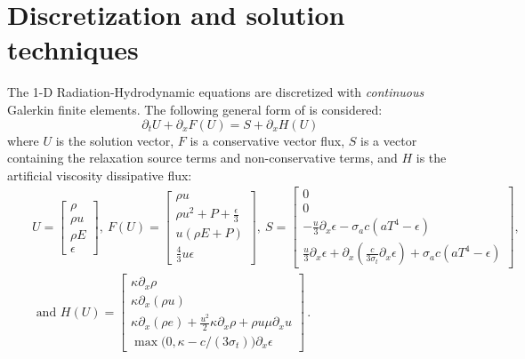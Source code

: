 \documentclass[times,doublespace]{fldauth}%
\begin{document}
\section{Discretization and solution techniques}
\label{sec:discr}
%
The 1-D Radiation-Hydrodynamic equations  are discretized with \emph{continuous} Galerkin finite elements. 
The following general form of  is considered:
\begin{equation}
\label{eq:form}
\partial_t U + \partial_x F \left( U \right) = S + \partial_x H \left(U\right) \,
\end{equation}
where $U$ is the solution vector, $F$ is a conservative vector flux, $S$ is a vector containing the relaxation source terms and non-conservative terms, and $H$ is the artificial viscosity dissipative flux:
\begin{eqnarray*}
&&U = 
\begin{bmatrix}
\rho \\
\rho u \\
\rho E \\
\epsilon
\end{bmatrix}
,\
F(U) = 
\begin{bmatrix}
\rho u \\
\rho u^2 + P + \frac{\epsilon}{3} \\
u \left( \rho E + P \right) \\
\frac{4}{3} u \epsilon
\end{bmatrix}
,\ 
S = 
\begin{bmatrix}
0 \\
0 \\
-\frac{u}{3} \partial_x \epsilon - \sigma_a c \left( a T^4 - \epsilon \right) \\
\frac{u}{3} \partial_x \epsilon + \partial_x \left( \frac{c}{3 \sigma_t} \partial_x \epsilon \right) + \sigma_a c \left( a T^4 - \epsilon \right)
\end{bmatrix}
,
\\
&&\text{ and } 
H(U) = 
\begin{bmatrix}
\kappa \partial_x \rho \\
\kappa \partial_x (\rho u) \\
\kappa \partial_x \left( \rho e \right) + \frac{u^2}{2} \kappa \partial_x \rho + \rho u \mu \partial_x u \\
\max \big( 0, \kappa- c/(3 \sigma_t) \big) \partial_x \epsilon 
\end{bmatrix} \,.
\end{eqnarray*}
\end{document}
